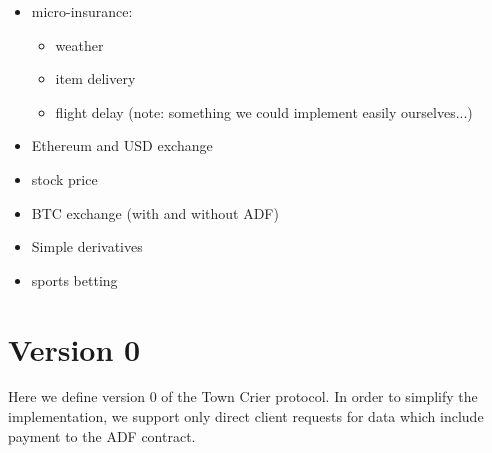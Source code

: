 \documentclass[letterpaper,twocolumn,10pt]{article}
\begin{document}
\begin{itemize}
\item micro-insurance:
    \begin{itemize}
    \item weather
    \item item delivery
    \item flight delay (note: something we could implement easily ourselves...)
    \end{itemize}
\item Ethereum and USD exchange
\item stock price
\item BTC exchange (with and without ADF)
\item Simple derivatives
\item sports betting
\end{itemize}







\section{Version 0}

Here we define version 0 of the Town Crier protocol.
In order to simplify the implementation, we support only direct client requests for data which include payment to the ADF contract.
\end{document}
